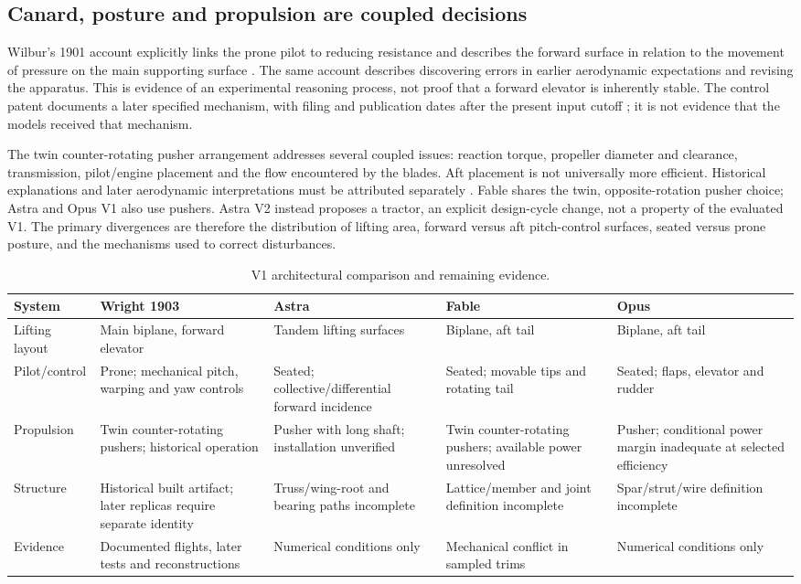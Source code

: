 \documentclass[11pt,a4paper]{article}
\begin{document}
\subsection{Canard, posture and propulsion are coupled decisions}
Wilbur's 1901 account explicitly links the prone pilot to reducing resistance and describes the forward surface in relation to the movement of pressure on the main supporting surface \cite{ref2}. The same account describes discovering errors in earlier aerodynamic expectations and revising the apparatus. This is evidence of an experimental reasoning process, not proof that a forward elevator is inherently stable. The control patent documents a later specified mechanism, with filing and publication dates after the present input cutoff \cite{ref3}; it is not evidence that the models received that mechanism.

The twin counter-rotating pusher arrangement addresses several coupled issues: reaction torque, propeller diameter and clearance, transmission, pilot/engine placement and the flow encountered by the blades. Aft placement is not universally more efficient. Historical explanations and later aerodynamic interpretations must be attributed separately \cite{ref5,ref6,ref11}. Fable shares the twin, opposite-rotation pusher choice; Astra and Opus V1 also use pushers. Astra V2 instead proposes a tractor, an explicit design-cycle change, not a property of the evaluated V1. The primary divergences are therefore the distribution of lifting area, forward versus aft pitch-control surfaces, seated versus prone posture, and the mechanisms used to correct disturbances.

\begin{table}[H]\centering\footnotesize
\caption{V1 architectural comparison and remaining evidence.}\label{tab:architecture}
\begin{tabularx}{\linewidth}{l*{4}{>{\raggedright\arraybackslash}X}}\toprule
System & Wright 1903 & Astra & Fable & Opus\\\midrule
Lifting layout & Main biplane, forward elevator & Tandem lifting surfaces & Biplane, aft tail & Biplane, aft tail\\
Pilot/control & Prone; mechanical pitch, warping and yaw controls & Seated; collective/differential forward incidence & Seated; movable tips and rotating tail & Seated; flaps, elevator and rudder\\
Propulsion & Twin counter-rotating pushers; historical operation & Pusher with long shaft; installation unverified & Twin counter-rotating pushers; available power unresolved & Pusher; conditional power margin inadequate at selected efficiency\\
Structure & Historical built artifact; later replicas require separate identity & Truss/wing-root and bearing paths incomplete & Lattice/member and joint definition incomplete & Spar/strut/wire definition incomplete\\
Evidence & Documented flights, later tests and reconstructions & Numerical conditions only & Mechanical conflict in sampled trims & Numerical conditions only\\\bottomrule
\end{tabularx}
\end{table}
\end{document}

